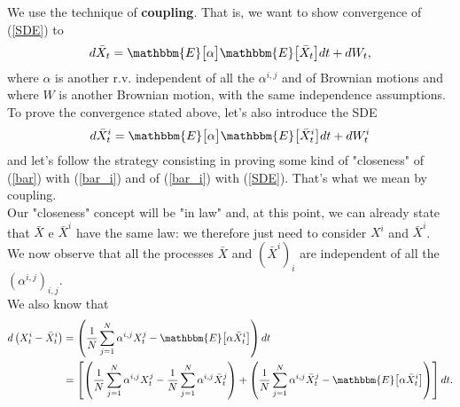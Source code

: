 We use the technique of \textbf{coupling}. That is, we want to show convergence of (\ref{SDE}) to \begin{equation} \label{bar} d \bar{X}_t = \mathbbm{E} \big[ \alpha \big] \mathbbm{E} \big[ \bar{X}_t \big] dt + d W_t, \end{equation} where $\alpha$ is another r.v. independent of all the $\alpha^{i, j}$ and of Brownian motions and where $W$ is another Brownian motion, with the same independence assumptions. To prove the convergence stated above, let's also introduce the SDE \begin{equation} \label{bar_i} d \bar{X}^i_t = \mathbbm{E} \big[ \alpha \big] \mathbbm{E} \big[ \bar{X}^i_t \big] dt + d W^i_t \end{equation} and let's follow the strategy consisting in proving some kind of "closeness" of (\ref{bar}) with (\ref{bar_i}) and of (\ref{bar_i}) with (\ref{SDE}). That's what we mean by coupling. \\
Our "closeness" concept will be "in law" and, at this point, we can already state that $\bar{X}$ e $\bar{X}^i$ have the same law: we therefore just need to consider $X^i$ and $\bar{X}^i$. \\

We now observe that all the processes $\bar{X}$ and $(\bar{X}^i)_i$ are independent of all the $(\alpha^{i,j})_{i,j}$. \\
We also know that \[ \begin{aligned} d \left( X^i_t - \bar{X}^i_t \right) &= \left( \frac{1}{N} \sum_{j = 1}^N \alpha^{i, j} X^j_t - \mathbbm{E} \big[ \alpha \bar{X}^i_t \big] \right) dt \\ &= \left[ \left( \frac{1}{N} \sum_{j = 1}^N \alpha^{i, j} X^j_t - \frac{1}{N} \sum_{j = 1}^N \alpha^{i, j} \bar{X}^j_t \right) + \left(\frac{1}{N} \sum_{j = 1}^N \alpha^{i, j} \bar{X}^j_t - \mathbbm{E} \big[ \alpha \bar{X}^i_t \big] \right) \right] dt. \end{aligned} \]

